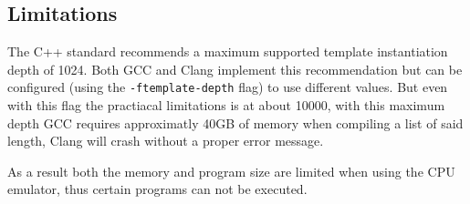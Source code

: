 \subsection{Limitations}
The C++ standard recommends a maximum supported template instantiation depth of 1024.
Both GCC and Clang implement this recommendation but can be configured 
(using the \texttt{-ftemplate-depth} flag) to use different values. But even with
this flag the practiacal limitations is at about 10000, with this maximum depth
GCC requires approximatly 40GB of memory when compiling a list of said length, Clang will
crash without a proper error message.

As a result both the memory and program size are limited when using the CPU emulator,
thus certain programs can not be executed.
